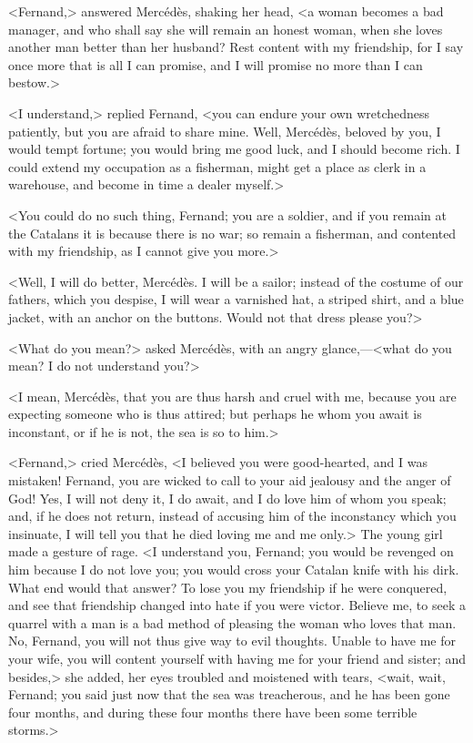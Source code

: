  <Fernand,> answered Mercédès, shaking her head, <a woman becomes a bad manager, and who shall say she will remain an honest woman, when she loves another man better than her husband? Rest content with my friendship, for I say once more that is all I can promise, and I will promise no more than I can bestow.> 

 <I understand,> replied Fernand, <you can endure your own wretchedness patiently, but you are afraid to share mine. Well, Mercédès, beloved by you, I would tempt fortune; you would bring me good luck, and I should become rich. I could extend my occupation as a fisherman, might get a place as clerk in a warehouse, and become in time a dealer myself.> 

 <You could do no such thing, Fernand; you are a soldier, and if you remain at the Catalans it is because there is no war; so remain a fisherman, and contented with my friendship, as I cannot give you more.> 

 <Well, I will do better, Mercédès. I will be a sailor; instead of the costume of our fathers, which you despise, I will wear a varnished hat, a striped shirt, and a blue jacket, with an anchor on the buttons. Would not that dress please you?> 

 <What do you mean?> asked Mercédès, with an angry glance,—<what do you mean? I do not understand you?> 

 <I mean, Mercédès, that you are thus harsh and cruel with me, because you are expecting someone who is thus attired; but perhaps he whom you await is inconstant, or if he is not, the sea is so to him.> 

 <Fernand,> cried Mercédès, <I believed you were good-hearted, and I was mistaken! Fernand, you are wicked to call to your aid jealousy and the anger of God! Yes, I will not deny it, I do await, and I do love him of whom you speak; and, if he does not return, instead of accusing him of the inconstancy which you insinuate, I will tell you that he died loving me and me only.> The young girl made a gesture of rage. <I understand you, Fernand; you would be revenged on him because I do not love you; you would cross your Catalan knife with his dirk. What end would that answer? To lose you my friendship if he were conquered, and see that friendship changed into hate if you were victor. Believe me, to seek a quarrel with a man is a bad method of pleasing the woman who loves that man. No, Fernand, you will not thus give way to evil thoughts. Unable to have me for your wife, you will content yourself with having me for your friend and sister; and besides,> she added, her eyes troubled and moistened with tears, <wait, wait, Fernand; you said just now that the sea was treacherous, and he has been gone four months, and during these four months there have been some terrible storms.> 

